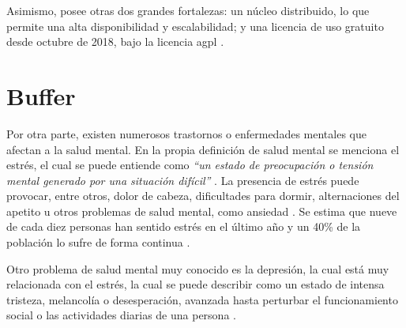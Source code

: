         Asimismo, posee otras dos grandes fortalezas: un núcleo distribuido, lo que permite una alta disponibilidad y escalabilidad; y una licencia de uso gratuito desde octubre de 2018, bajo la licencia \gls{agpl} \cite{mongodb_que_nodate}.

\section{Buffer}


%

Por otra parte, existen numerosos trastornos o enfermedades mentales que afectan a la salud mental. En la propia definición de salud mental se menciona el estrés, el cual se puede entiende como  \textit{``un estado de preocupación o tensión mental generado por una situación difícil''}  \cite{oms_estres_2023}. La presencia de estrés puede provocar, entre otros, dolor de cabeza, dificultades para dormir, alternaciones del apetito u otros problemas de salud mental, como ansiedad \cite{oms_estres_2023}. Se estima que nueve de cada diez personas han sentido estrés en el último año y un 40\% de la población lo sufre de forma continua \cite{nogera_mas_estres_2024}.

Otro problema de salud mental muy conocido es la depresión, la cual está muy relacionada con el estrés, la cual se puede describir como un estado de intensa tristeza, melancolía o desesperación, avanzada hasta perturbar el funcionamiento social o las actividades diarias de una persona \cite{van_neerven_rarrxr_2008}. 